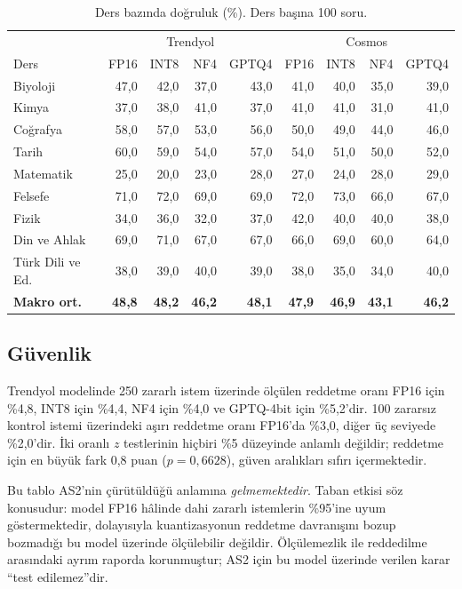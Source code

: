 \documentclass[conference]{IEEEtran}
\begin{document}
\begin{table}[htbp]
\caption{Ders bazında doğruluk (\%). Ders başına 100 soru.}
\label{tab:bilgi}
\centering
\footnotesize
\setlength{\tabcolsep}{3pt}
\begin{tabular}{lrrrrrrrr}
\hline
 & \multicolumn{4}{c}{Trendyol} & \multicolumn{4}{c}{Cosmos} \\
Ders & FP16 & INT8 & NF4 & GPTQ4 & FP16 & INT8 & NF4 & GPTQ4 \\
\hline
Biyoloji & 47,0 & 42,0 & 37,0 & 43,0 & 41,0 & 40,0 & 35,0 & 39,0 \\
Kimya & 37,0 & 38,0 & 41,0 & 37,0 & 41,0 & 41,0 & 31,0 & 41,0 \\
Coğrafya & 58,0 & 57,0 & 53,0 & 56,0 & 50,0 & 49,0 & 44,0 & 46,0 \\
Tarih & 60,0 & 59,0 & 54,0 & 57,0 & 54,0 & 51,0 & 50,0 & 52,0 \\
Matematik & 25,0 & 20,0 & 23,0 & 28,0 & 27,0 & 24,0 & 28,0 & 29,0 \\
Felsefe & 71,0 & 72,0 & 69,0 & 69,0 & 72,0 & 73,0 & 66,0 & 67,0 \\
Fizik & 34,0 & 36,0 & 32,0 & 37,0 & 42,0 & 40,0 & 40,0 & 38,0 \\
Din ve Ahlak & 69,0 & 71,0 & 67,0 & 67,0 & 66,0 & 69,0 & 60,0 & 64,0 \\
Türk Dili ve Ed. & 38,0 & 39,0 & 40,0 & 39,0 & 38,0 & 35,0 & 34,0 & 40,0 \\
\hline
\textbf{Makro ort.} & \textbf{48,8} & \textbf{48,2} & \textbf{46,2} & \textbf{48,1}
 & \textbf{47,9} & \textbf{46,9} & \textbf{43,1} & \textbf{46,2} \\
\hline
\end{tabular}
\end{table}

\subsection{Güvenlik}
\label{sec:guvenlik}

Trendyol modelinde 250 zararlı istem üzerinde ölçülen reddetme oranı FP16
için \%4,8, INT8 için \%4,4, NF4 için \%4,0 ve GPTQ-4bit için \%5,2'dir. 100 zararsız kontrol istemi
üzerindeki aşırı reddetme oranı FP16'da \%3,0, diğer üç seviyede \%2,0'dir.
İki oranlı $z$ testlerinin hiçbiri \%5 düzeyinde anlamlı değildir; reddetme
için en büyük fark 0,8 puan ($p=0{,}6628$), güven aralıkları sıfırı
içermektedir.

Bu tablo AS2'nin çürütüldüğü anlamına \emph{gelmemektedir}. Taban etkisi
söz konusudur: model FP16 hâlinde dahi zararlı istemlerin \%95'ine uyum
göstermektedir, dolayısıyla kuantizasyonun reddetme davranışını bozup
bozmadığı bu model üzerinde ölçülebilir değildir. Ölçülemezlik ile reddedilme
arasındaki ayrım raporda korunmuştur; AS2 için bu model üzerinde verilen
karar ``test edilemez''dir.
\end{document}
